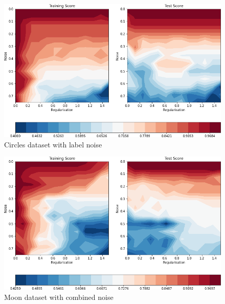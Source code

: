 \documentclass[9.5pt]{beamer}
\begin{document}
    \begin{frame}{}
        \bigskip
        \begin{figure}
            \centering
            \includegraphics[width=\linewidth]{images/circles_label}
            \caption{Circles dataset with label noise}
        \end{figure}
    \end{frame}
    \begin{frame}{}
        \bigskip
        \begin{figure}
            \centering
            \includegraphics[width=\linewidth]{images/moon_combined}
            \caption{Moon dataset with combined noise}
        \end{figure}
    \end{frame}
\end{document}
